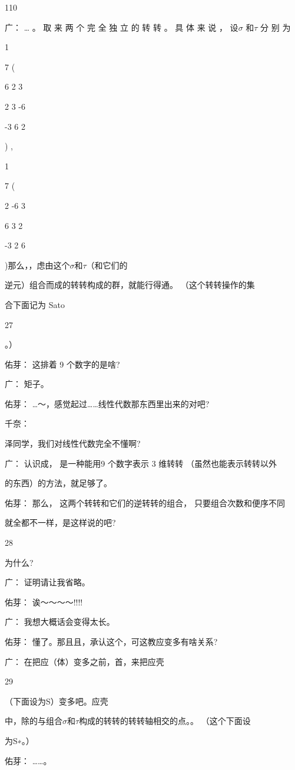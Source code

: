 110\par
广： … 。 取 来 两 个 完 全 独 立 的 转 转 。 具 体 来 说 ， 设$\sigma$ 和$\tau$ 分 别 为\par
1\par
7 (\par
6 2 3\par
2 3 -6\par
-3 6 2\par
) ,\par
1\par
7 (\par
2 -6 3\par
6 3 2\par
-3 2 6\par
)那么，，虑由这个$\sigma$和$\tau$（和它们的\par
逆元）组合而成的转转构成的群，就能行得通。 （这个转转操作的集\par
合下面记为 Sato\par
27\par
。）\par
佑芽： 这排着 9 个数字的是啥?\par
广： 矩子。\par
佑芽： …～，感觉起过……线性代数那东西里出来的对吧?\par
千奈：\par
泽同学，我们对线性代数完全不懂啊?\par
广： 认识成， 是一种能用9 个数字表示 3 维转转 （虽然也能表示转转以外\par
的东西）的方法，就足够了。\par
佑芽： 那么， 这两个转转和它们的逆转转的组合， 只要组合次数和便序不同\par
就全都不一样，是这样说的吧?\par
28\par
为什么?\par
广： 证明请让我省略。\par
佑芽： 诶～～～～!!!!\par
广： 我想大概话会变得太长。\par
佑芽： 懂了。那且且，承认这个，可这教应变多有啥关系?\par
广： 在把应（体）变多之前，首，来把应壳\par
29\par
（下面设为S）变多吧。应壳\par
中，除的与组合$\sigma$和$\tau$构成的转转的转转轴相交的点。。 （这个下面设\par
为S∗。）\par
佑芽： ……。\par
